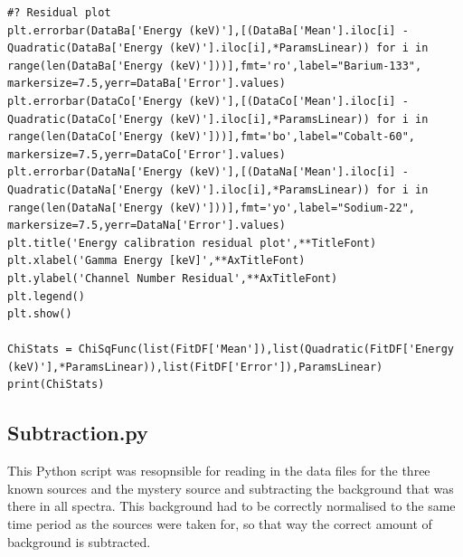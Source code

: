 \documentclass[11pt,a4paper]{article}
\begin{document}
\begin{verbatim}
#? Residual plot
plt.errorbar(DataBa['Energy (keV)'],[(DataBa['Mean'].iloc[i] - Quadratic(DataBa['Energy (keV)'].iloc[i],*ParamsLinear)) for i in range(len(DataBa['Energy (keV)']))],fmt='ro',label="Barium-133", markersize=7.5,yerr=DataBa['Error'].values)
plt.errorbar(DataCo['Energy (keV)'],[(DataCo['Mean'].iloc[i] - Quadratic(DataCo['Energy (keV)'].iloc[i],*ParamsLinear)) for i in range(len(DataCo['Energy (keV)']))],fmt='bo',label="Cobalt-60", markersize=7.5,yerr=DataCo['Error'].values)
plt.errorbar(DataNa['Energy (keV)'],[(DataNa['Mean'].iloc[i] - Quadratic(DataNa['Energy (keV)'].iloc[i],*ParamsLinear)) for i in range(len(DataNa['Energy (keV)']))],fmt='yo',label="Sodium-22", markersize=7.5,yerr=DataNa['Error'].values)
plt.title('Energy calibration residual plot',**TitleFont)
plt.xlabel('Gamma Energy [keV]',**AxTitleFont)
plt.ylabel('Channel Number Residual',**AxTitleFont)
plt.legend()
plt.show()

ChiStats = ChiSqFunc(list(FitDF['Mean']),list(Quadratic(FitDF['Energy (keV)'],*ParamsLinear)),list(FitDF['Error']),ParamsLinear)
print(ChiStats)
\end{verbatim}
\clearpage

\subsection{Subtraction.py}

This Python script was resopnsible for reading in the data files for the three known sources and the mystery source and subtracting the background that was there in all spectra. This background had to be correctly normalised to the same time period as the sources were taken for, so that way the correct amount of background is subtracted. 
\end{document}
